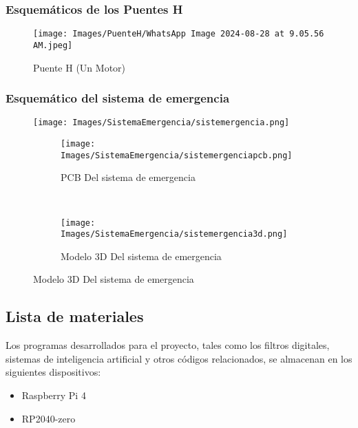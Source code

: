 \documentclass{article}
\begin{document}
\subsubsection{Esquemáticos de los Puentes H}
\begin{figure}[H]
    \centering
     \texttt{[image: Images/PuenteH/WhatsApp Image 2024-08-28 at 9.05.56 AM.jpeg]}
    \caption{Puente H (Un Motor)}
\end{figure}

\subsubsection{Esquemático del sistema de emergencia}
\begin{figure}[H]
    \centering
    \texttt{[image: Images/SistemaEmergencia/sistemergencia.png]}
    \caption{Esquemático del sistema de emegencia}


    \begin{subfigure}[t]{0.5\textwidth}
        \centering
        \texttt{[image: Images/SistemaEmergencia/sistemergenciapcb.png]}
        \caption{PCB Del sistema de emergencia}
    \end{subfigure}%
    ~ 
    \begin{subfigure}[t]{0.5\textwidth}
        \centering
        \texttt{[image: Images/SistemaEmergencia/sistemergencia3d.png]}
        \caption{Modelo 3D Del sistema de emergencia}
    \end{subfigure}

\end{figure}

\subsection{Lista de materiales}
Los programas desarrollados para el proyecto, tales como los filtros digitales, sistemas de inteligencia artificial y otros códigos relacionados, se almacenan en los siguientes dispositivos:

\begin{itemize}
    \item Raspberry Pi 4
    \item RP2040-zero
\end{itemize}
\end{document}
